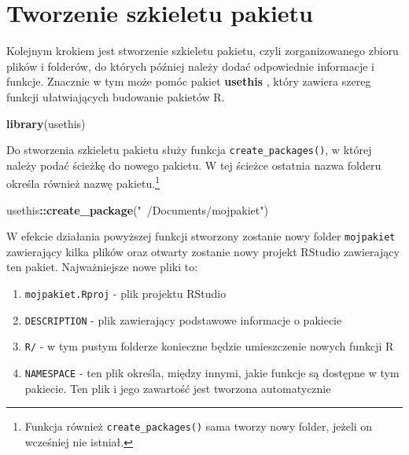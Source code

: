 \documentclass[paper=6in:9in,pagesize=pdftex,headinclude=on,footinclude=on,10pt]{scrbook}
\newenvironment{Shaded}{\begin{snugshade}}{\end{snugshade}}
\newcommand{\KeywordTok}[1]{\textcolor[rgb]{0.13,0.29,0.53}{\textbf{#1}}}
\newcommand{\NormalTok}[1]{#1}
\newcommand{\OperatorTok}[1]{\textcolor[rgb]{0.81,0.36,0.00}{\textbf{#1}}}
\newcommand{\StringTok}[1]{\textcolor[rgb]{0.31,0.60,0.02}{#1}}
\providecommand{\tightlist}{%
  \setlength{\itemsep}{0pt}\setlength{\parskip}{0pt}}
\begin{document}
\hypertarget{tworzenie-szkieletu-pakietu}{%
\section{Tworzenie szkieletu pakietu}\label{tworzenie-szkieletu-pakietu}}

Kolejnym krokiem jest stworzenie szkieletu pakietu, czyli zorganizowanego zbioru plików i folderów, do których później należy dodać odpowiednie informacje i funkcje.
Znacznie w tym może pomóc pakiet \textbf{usethis} \citep{R-usethis}, który zawiera szereg funkcji ułatwiających budowanie pakietów R.

\begin{Shaded}
\begin{Highlighting}[]
\KeywordTok{library}\NormalTok{(usethis)}
\end{Highlighting}
\end{Shaded}

Do stworzenia szkieletu pakietu służy funkcja \texttt{create\_packages()}, w której należy podać ścieżkę do nowego pakietu.
W tej ścieżce ostatnia nazwa folderu określa również nazwę pakietu.\footnote{Funkcja również \texttt{create\_packages()} sama tworzy nowy folder, jeżeli on wcześniej nie istniał.}

\begin{Shaded}
\begin{Highlighting}[]
\NormalTok{usethis}\OperatorTok{::}\KeywordTok{create_package}\NormalTok{(}\StringTok{"~/Documents/mojpakiet"}\NormalTok{)}
\end{Highlighting}
\end{Shaded}

W efekcie działania powyższej funkcji stworzony zostanie nowy folder \texttt{mojpakiet} zawierający kilka plików oraz otwarty zostanie nowy projekt RStudio zawierający ten pakiet.
Najważniejsze nowe pliki to:

\begin{enumerate}
\def\labelenumi{\arabic{enumi}.}
\tightlist
\item
  \texttt{mojpakiet.Rproj} - plik projektu RStudio
\item
  \texttt{DESCRIPTION} - plik zawierający podstawowe informacje o pakiecie
\item
  \texttt{R/} - w tym pustym folderze konieczne będzie umieszczenie nowych funkcji R
\item
  \texttt{NAMESPACE} - ten plik określa, między innymi, jakie funkcje są dostępne w tym pakiecie.
  Ten plik i jego zawartość jest tworzona automatycznie
\end{enumerate}
\end{document}
